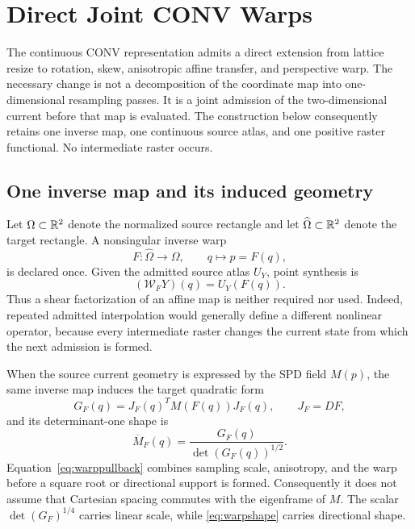 \providecommand{\WarpFigureRoot}{../support_geometry}
\appendices
\section{Direct Joint CONV Warps}
\label{app:directwarp}

The continuous CONV representation admits a direct extension from lattice
resize to rotation, skew, anisotropic affine transfer, and perspective warp.
The necessary change is not a decomposition of the coordinate map into
one-dimensional resampling passes.  It is a joint admission of the
two-dimensional current before that map is evaluated.  The construction
below consequently retains one inverse map, one continuous source atlas, and
one positive raster functional.  No intermediate raster occurs.

\subsection{One inverse map and its induced geometry}

Let \(\Omega\subset\mathbb{R}^2\) denote the normalized source rectangle and let
\(\widehat\Omega\subset\mathbb{R}^2\) denote the target rectangle.  A nonsingular
inverse warp
\begin{equation}
 F:\widehat\Omega\longrightarrow\Omega,\qquad q\longmapsto p=F(q),
 \label{eq:warpmap}
\end{equation}
is declared once.  Given the admitted source atlas \(U_Y\), point synthesis is
\begin{equation}
 (\mathcal W_FY)(q)=U_Y(F(q)).
 \label{eq:warppoint}
\end{equation}
Thus a shear factorization of an affine map is neither required nor used.
Indeed, repeated admitted interpolation would generally define a different
nonlinear operator, because every intermediate raster changes the current
state from which the next admission is formed.

When the source current geometry is expressed by the SPD field \(M(p)\), the
same inverse map induces the target quadratic form
\begin{equation}
 G_F(q)=J_F(q)^TM(F(q))J_F(q),
 \qquad J_F=DF,
 \label{eq:warppullback}
\end{equation}
and its determinant-one shape is
\begin{equation}
 \overline M_F(q)=\frac{G_F(q)}{\det(G_F(q))^{1/2}}.
 \label{eq:warpshape}
\end{equation}
Equation~\eqref{eq:warppullback} combines sampling scale, anisotropy, and the
warp before a square root or directional support is formed.  Consequently it
does not assume that Cartesian spacing commutes with the eigenframe of
\(M\).  The scalar \(\det(G_F)^{1/4}\) carries linear scale, while
\eqref{eq:warpshape} carries directional shape.

